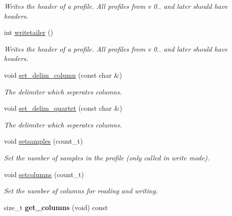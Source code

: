 \begin{DoxyCompactItemize}
\begin{DoxyCompactList}\small\item\em Writes the header of a profile. All profiles from v 0.. and later should have headers. \end{DoxyCompactList}\item 
\hypertarget{classprofile_a3089bc418634f442ef71b930abc68edd}{int \hyperlink{classprofile_a3089bc418634f442ef71b930abc68edd}{writetailer} ()}\label{classprofile_a3089bc418634f442ef71b930abc68edd}

\begin{DoxyCompactList}\small\item\em Writes the header of a profile. All profiles from v 0.. and later should have headers. \end{DoxyCompactList}\item 
\hypertarget{classprofile_abe49022e667f3e893dec454511e9aa3d}{void \hyperlink{classprofile_abe49022e667f3e893dec454511e9aa3d}{set\-\_\-delim\-\_\-column} (const char \&)}\label{classprofile_abe49022e667f3e893dec454511e9aa3d}

\begin{DoxyCompactList}\small\item\em The delimiter which seperates columns. \end{DoxyCompactList}\item 
\hypertarget{classprofile_a627ca3883b151c65a50d0e5e02b40998}{void \hyperlink{classprofile_a627ca3883b151c65a50d0e5e02b40998}{set\-\_\-delim\-\_\-quartet} (const char \&)}\label{classprofile_a627ca3883b151c65a50d0e5e02b40998}

\begin{DoxyCompactList}\small\item\em The delimiter which seperates columns. \end{DoxyCompactList}\item 
void \hyperlink{classprofile_a7f2ca504635bc0e0ee4cbe7af60cefab}{setsamples} (count\-\_\-t)
\begin{DoxyCompactList}\small\item\em Set the number of samples in the profile (only called in write mode). \end{DoxyCompactList}\item 
\hypertarget{classprofile_af3b7cfdb2950a22565e61470d354c9e7}{void \hyperlink{classprofile_af3b7cfdb2950a22565e61470d354c9e7}{setcolumns} (count\-\_\-t)}\label{classprofile_af3b7cfdb2950a22565e61470d354c9e7}

\begin{DoxyCompactList}\small\item\em Set the number of columns for reading and writing. \end{DoxyCompactList}\item 
\hypertarget{classprofile_a19ccde4e7a1fffea1b40184b74826722}{size\-\_\-t {\bfseries get\-\_\-columns} (void) const }\label{classprofile_a19ccde4e7a1fffea1b40184b74826722}


\end{DoxyCompactItemize}
